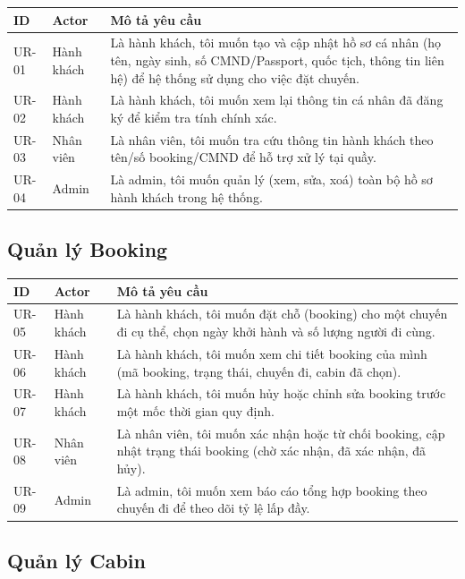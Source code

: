 \documentclass[a4paper,11pt]{article}
\begin{document}
\begin{longtable}{L{1.6cm} L{2.6cm} L{9.5cm}}
\toprule
\textbf{ID} & \textbf{Actor} & \textbf{Mô tả yêu cầu} \\
\midrule
\endhead
UR-01 & Hành khách & Là hành khách, tôi muốn tạo và cập nhật hồ sơ cá nhân (họ tên, ngày sinh, số CMND/Passport, quốc tịch, thông tin liên hệ) để hệ thống sử dụng cho việc đặt chuyến. \\
UR-02 & Hành khách & Là hành khách, tôi muốn xem lại thông tin cá nhân đã đăng ký để kiểm tra tính chính xác. \\
UR-03 & Nhân viên & Là nhân viên, tôi muốn tra cứu thông tin hành khách theo tên/số booking/CMND để hỗ trợ xử lý tại quầy. \\
UR-04 & Admin & Là admin, tôi muốn quản lý (xem, sửa, xoá) toàn bộ hồ sơ hành khách trong hệ thống. \\
\bottomrule
\end{longtable}

\subsection{Quản lý Booking}

\begin{longtable}{L{1.6cm} L{2.6cm} L{9.5cm}}
\toprule
\textbf{ID} & \textbf{Actor} & \textbf{Mô tả yêu cầu} \\
\midrule
\endhead
UR-05 & Hành khách & Là hành khách, tôi muốn đặt chỗ (booking) cho một chuyến đi cụ thể, chọn ngày khởi hành và số lượng người đi cùng. \\
UR-06 & Hành khách & Là hành khách, tôi muốn xem chi tiết booking của mình (mã booking, trạng thái, chuyến đi, cabin đã chọn). \\
UR-07 & Hành khách & Là hành khách, tôi muốn hủy hoặc chỉnh sửa booking trước một mốc thời gian quy định. \\
UR-08 & Nhân viên & Là nhân viên, tôi muốn xác nhận hoặc từ chối booking, cập nhật trạng thái booking (chờ xác nhận, đã xác nhận, đã hủy). \\
UR-09 & Admin & Là admin, tôi muốn xem báo cáo tổng hợp booking theo chuyến đi để theo dõi tỷ lệ lấp đầy. \\
\bottomrule
\end{longtable}

\subsection{Quản lý Cabin}
\end{document}
